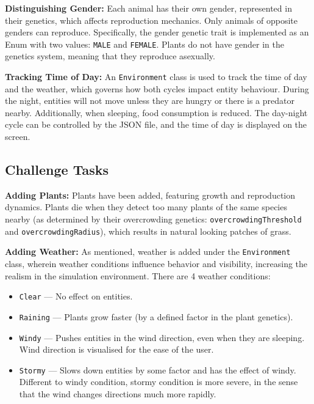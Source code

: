 \documentclass[10pt, a4paper]{scrartcl}
\begin{document}
\begin{multicols}{2}
    \noindent \textbf{Distinguishing Gender:} Each animal has their own gender, represented in their genetics,
    which affects reproduction mechanics. Only animals of opposite genders can reproduce. Specifically, the gender genetic trait
    is implemented as an Enum with two values: \verb|MALE| and \verb|FEMALE|. Plants do not have gender in the genetics system,
    meaning that they reproduce asexually.

    \noindent \textbf{Tracking Time of Day:} An \verb|Environment| class is used to track the time of day and the weather,
    which governs how both cycles impact entity behaviour. During the night, entities will not move unless they are hungry
    or there is a predator nearby. Additionally, when sleeping, food consumption is reduced. The day-night cycle can be controlled
    by the JSON file, and the time of day is displayed on the screen.

    \subsection{Challenge Tasks}

    \noindent \textbf{Adding Plants:} Plants have been added, featuring growth and reproduction dynamics.
    Plants die when they detect too many plants of the same species nearby (as determined by their overcrowding genetics:
    \verb|overcrowdingThreshold| and \verb|overcrowdingRadius|), which results in natural looking patches of grass.

    \noindent \textbf{Adding Weather:} As mentioned, weather is added under the \verb|Environment| class, wherein
    weather conditions influence behavior and visibility, increasing the realism in the simulation environment.
    There are 4 weather conditions:
    \begin{itemize}
      \item \verb|Clear| — No effect on entities.
      \item \verb|Raining| — Plants grow faster (by a defined factor in the plant genetics).
      \item \verb|Windy| — Pushes entities in the wind direction, even when they are sleeping.
      Wind direction is visualised for the ease of the user.
      \item \verb|Stormy| — Slows down entities by some factor and has the effect of windy. Different to
      windy condition, stormy condition is more severe, in the sense that the wind changes directions much more rapidly.
    \end{itemize}


\end{multicols}
\end{document}
